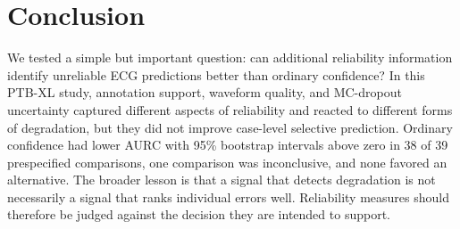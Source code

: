 \documentclass[journal]{IEEEtran}
\begin{document}
\section{Conclusion}
We tested a simple but important question: can additional reliability information identify unreliable ECG predictions better than ordinary confidence? In this PTB-XL study, annotation support, waveform quality, and MC-dropout uncertainty captured different aspects of reliability and reacted to different forms of degradation, but they did not improve case-level selective prediction. Ordinary confidence had lower AURC with 95\% bootstrap intervals above zero in 38 of 39 prespecified comparisons, one comparison was inconclusive, and none favored an alternative. The broader lesson is that a signal that detects degradation is not necessarily a signal that ranks individual errors well. Reliability measures should therefore be judged against the decision they are intended to support.

\appendices
\end{document}
